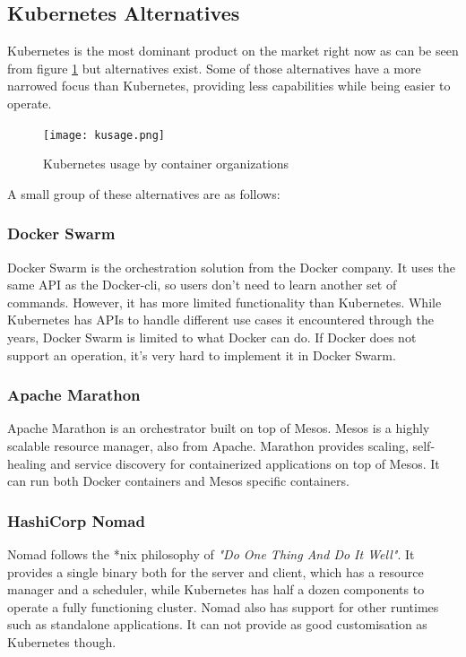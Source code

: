 \subsection*{Kubernetes Alternatives}
Kubernetes is the most dominant product on the market right now as can be seen from figure \ref{fig:kusage} but alternatives exist. Some of those alternatives have a more narrowed focus than Kubernetes, providing less capabilities while being easier to operate. 

\begin{figure}[htpb]
  \centering
  \texttt{[image: kusage.png]}\caption{Kubernetes usage by container organizations \cite{datadog}}\label{fig:kusage}
\end{figure}

A small group of these alternatives are as follows:

\subsubsection*{Docker Swarm}
Docker Swarm is the orchestration solution from the Docker company. It uses the same API as the Docker-cli, so users don't need to learn another set of commands. However, it has more limited functionality than Kubernetes. While Kubernetes has APIs to handle different use cases it encountered through the years, Docker Swarm is limited to what Docker can do. If Docker does not support an operation, it's very hard to implement it in Docker Swarm.

\subsubsection*{Apache Marathon}
Apache Marathon is an orchestrator built on top of Mesos. Mesos is a highly scalable resource manager, also from Apache. Marathon provides scaling, self-healing and service discovery for containerized applications on top of Mesos. It can run both Docker containers and Mesos specific containers.

\subsubsection*{HashiCorp Nomad}
Nomad follows the *nix philosophy of \textit{"Do One Thing And Do It Well"}. It provides a single binary both for the server and client, which has a resource manager and a scheduler, while Kubernetes has half a dozen components to operate a fully functioning cluster. Nomad also has support for other runtimes such as standalone applications. It can not provide as good customisation as Kubernetes though.

